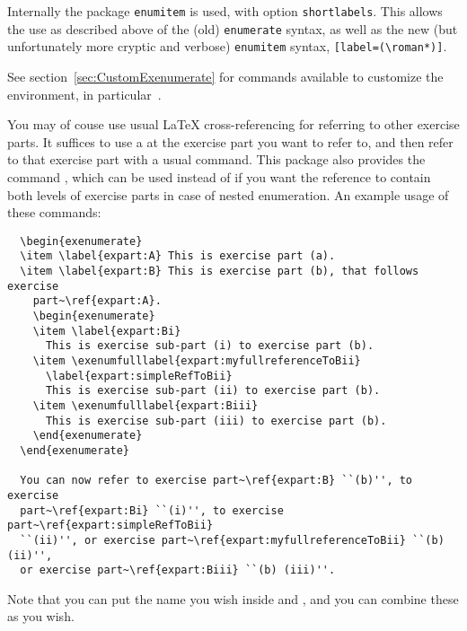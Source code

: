 \documentclass[11pt,a4paper]{article}
\begin{document}
\begin{pkgtip}
  Internally the package \texttt{enumitem} is used, with option \texttt{shortlabels}. This
  allows the use as described above of the (old) \texttt{enumerate} syntax, as well as the
  new (but unfortunately more cryptic and verbose) \texttt{enumitem} syntax,
  \texttt{[label=(\textbackslash roman*)]}.

  See section~\ref{sec:CustomExenumerate} for commands available to customize the
   environment, in particular~.
\end{pkgtip}


You may of couse use usual \LaTeX{} cross-referencing for referring to other exercise
parts. It suffices to use a  at the exercise part you want to refer to, and
then refer to that exercise part with a usual  command. This package also
provides the command , which can be used instead of
 if you want the reference to contain both levels of exercise parts in case
of nested enumeration. An example usage of these commands:
\begin{pkgverbatim}
\begin{verbatim}
  \begin{exenumerate}
  \item \label{expart:A} This is exercise part (a).
  \item \label{expart:B} This is exercise part (b), that follows exercise
    part~\ref{expart:A}.
    \begin{exenumerate}
    \item \label{expart:Bi}
      This is exercise sub-part (i) to exercise part (b).
    \item \exenumfulllabel{expart:myfullreferenceToBii}
      \label{expart:simpleRefToBii}
      This is exercise sub-part (ii) to exercise part (b).
    \item \exenumfulllabel{expart:Biii}
      This is exercise sub-part (iii) to exercise part (b).
    \end{exenumerate}
  \end{exenumerate}

  You can now refer to exercise part~\ref{expart:B} ``(b)'', to exercise
  part~\ref{expart:Bi} ``(i)'', to exercise part~\ref{expart:simpleRefToBii}
  ``(ii)'', or exercise part~\ref{expart:myfullreferenceToBii} ``(b) (ii)'',
  or exercise part~\ref{expart:Biii} ``(b) (iii)''.

\end{verbatim}
\end{pkgverbatim}
Note that you can put the name you wish inside  and
, and you can combine these as you wish.
\end{document}
